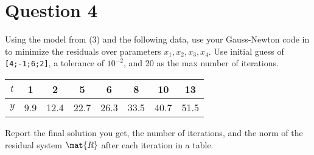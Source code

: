 \section{Question 4}

\begin{question}
    Using the model from (3) and the following data, use your Gauss-Newton code in \MATLAB to minimize the residuals over parameters $x_1, x_2, x_3, x_4$. Use initial guess of \verb+[4;-1;6;2]+, a tolerance of $10^{-2}$, and 20 as the max number of iterations.
    \begin{center}
        \begin{tabular}{c|c|c|c|c|c|c|c}
            $t$ & 1 & 2 & 5 & 6 & 8 & 10 & 13 \\
            \hline
            $y$ & 9.9 & 12.4 & 22.7 & 26.3 & 33.5 & 40.7 & 51.5
        \end{tabular} 
    \end{center}
Report the final solution you get, the number of iterations, and the norm of the 
residual system $\mat{R}$ after each iteration in a table. 
\end{question}

